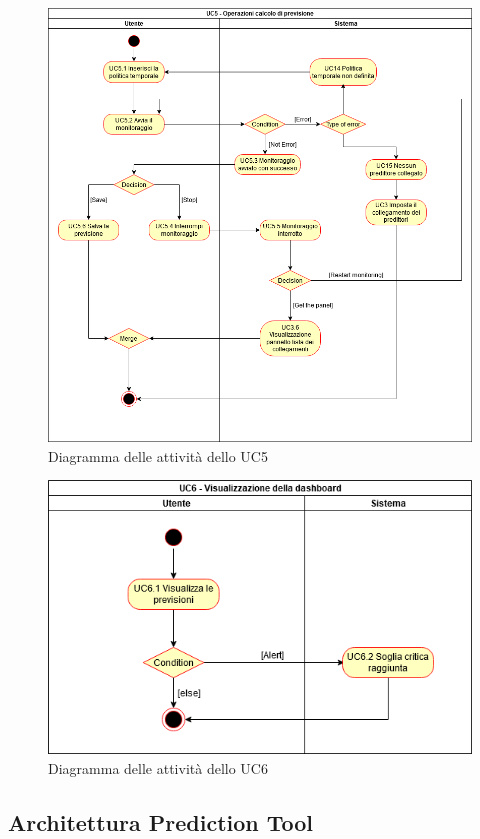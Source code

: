 \begin{figure}[H]
\centering
\includegraphics[scale=0.5]{../../Diagrams/Activity_diagrams/uc5.png}
\caption{Diagramma delle attività dello UC5}
\end{figure}
\begin{figure}[H]
\centering
\includegraphics[scale=0.6]{../../Diagrams/Activity_diagrams/uc6.png}
\caption{Diagramma delle attività dello UC6}
\end{figure}

\subsection{Architettura Prediction Tool}

